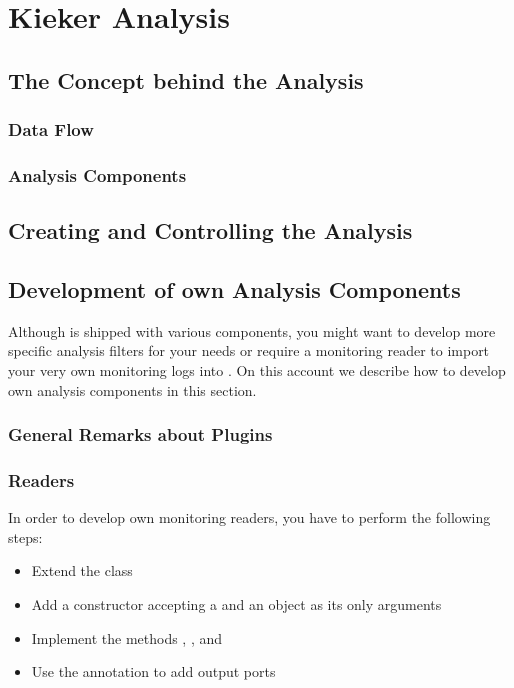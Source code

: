 \chapter{Kieker Analysis}\label{chp:Kieker-Analysis}
	\section{The Concept behind the Analysis}	
		\subsection{Data Flow}
		\subsection{Analysis Components}
	\section{Creating and Controlling the Analysis}
	\section{Development of own Analysis Components}
	
		 Although \Kieker{} is shipped with various components, you might want to develop more specific analysis filters for your needs or require a monitoring reader to import your very own monitoring logs into \Kieker{}. On this account we describe how to develop own analysis components in this section.
	
		\subsection{General Remarks about Plugins}
		
		\subsection{Readers}
		
			In order to develop own monitoring readers, you have to perform the following steps:
			\begin{itemize}
				\setlength{\itemsep}{-2pt}
				\item Extend the class 
				\item Add a constructor accepting a  and an  object as its only arguments
				\item Implement the methods , , and 
				\item Use the  annotation to add output ports
			\end{itemize}
		
